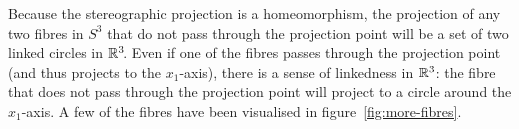 \begin{figure}
\begin{center}
\end{center}
\end{figure}

Because the stereographic projection is a homeomorphism,
the projection of any two fibres in $S^3$ that do not pass through the projection point
will be a set of two linked circles in $\mathbb{R}^3\!$.
Even if one of the fibres passes through the projection point
(and thus projects to the $x_1$-axis),
there is a sense of linkedness in $\mathbb{R}^3$:
the fibre that does not pass through the projection point
will project to a circle around the $x_1$-axis.
A few of the fibres have been visualised in figure~\ref{fig:more-fibres}.

%

